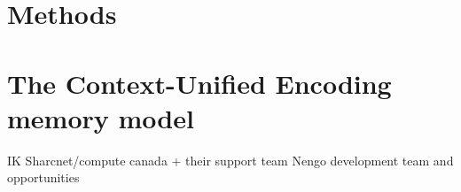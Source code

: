 \documentclass[
    paper=letter,
    12pt,
    titlepage,
    twoside,
    final,
    BCOR=10mm,
    DIV=9,
    listof=totoc]{scrbook}
\begin{document}
 

\part{Methods}





\part{The Context-Unified Encoding memory model}










IK
Sharcnet/compute canada + their support team
Nengo development team and opportunities

\printbibliography[heading=bibintoc,title=References]

\appendix
{}



\end{document}
